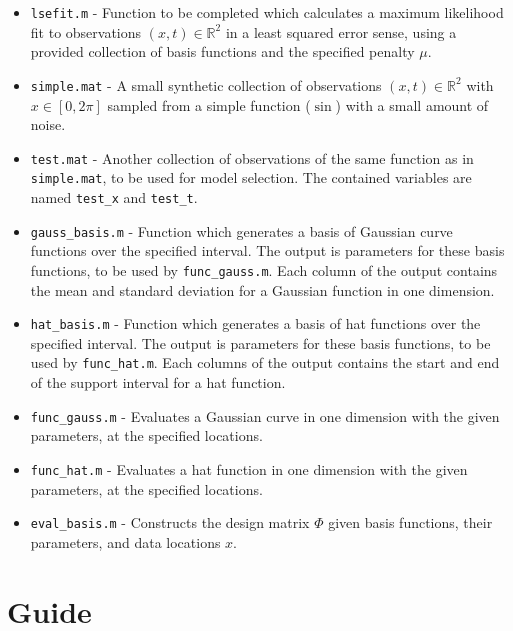 \documentclass[11pt,noanswers,addpoints]{exam}
\begin{document}
\begin{itemize}
\item \texttt{lsefit.m} - Function to be completed which calculates a maximum likelihood fit to
observations $(x,t)\in\mathbb{R}^2$ in a least squared error sense, using a provided collection of
basis functions and the specified penalty $\mu$.

\item \texttt{simple.mat} - A small synthetic collection of observations $(x,t)\in\mathbb{R}^2$ with $x \in [0, 2\pi]$ sampled
from a simple function ($\sin$) with a small amount of noise.
\item \texttt{test.mat} - Another collection of observations of the same function as in \texttt{simple.mat}, to be used for
model selection. The contained variables are named \texttt{test\_x} and \texttt{test\_t}.

\item \texttt{gauss\_basis.m} - Function which generates a basis of Gaussian curve functions over the specified interval.
The output is parameters for these basis functions, to be used by \texttt{func\_gauss.m}. Each column of the output
contains the mean and standard deviation for a Gaussian function in one dimension.
\item \texttt{hat\_basis.m} - Function which generates a basis of hat functions over the specified interval.
The output is parameters for these basis functions, to be used by \texttt{func\_hat.m}. Each columns of the output
contains the start and end of the support interval for a hat function.

\item \texttt{func\_gauss.m} - Evaluates a Gaussian curve in one dimension with the given parameters, at the
specified locations.
\item \texttt{func\_hat.m} - Evaluates a hat function in one dimension with the given parameters, at the
specified locations.
\item \texttt{eval\_basis.m} - Constructs the design matrix $\Phi$ given basis functions, their parameters, and data locations $x$.
\end{itemize}



\section{Guide}
\end{document}
